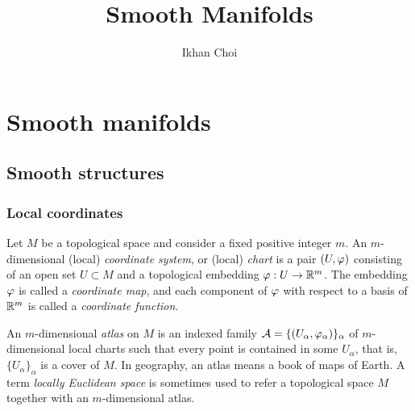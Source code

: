 \documentclass{../../large}
\begin{document}
\title{Smooth Manifolds}
\author{Ikhan Choi}
\maketitle
\tableofcontents





\part{Smooth manifolds}


\chapter{Smooth structures}

\section{Local coordinates}


\begin{prb}[Atlases]
Let $M$ be a topological space and consider a fixed positive integer $m$.
An $m$-dimensional (local) \emph{coordinate system}, or (local) \emph{chart} is a pair $(U,\varphi)$ consisting of an open set $U\subset M$ and a topological embedding $\varphi:U\to\mathbb{R}^m$.
The embedding $\varphi$ is called a \emph{coordinate map}, and each component of $\varphi$ with respect to a basis of $\mathbb{R}^m$ is called a \emph{coordinate function}.

An $m$-dimensional \emph{atlas} on $M$ is an indexed family $\mathcal{A}=\{(U_\alpha,\varphi_\alpha)\}_\alpha$ of $m$-dimensional local charts such that every point is contained in some $U_\alpha$, that is, $\{U_\alpha\}_\alpha$ is a cover of $M$.
In geography, an atlas means a book of maps of Earth.
A term \emph{locally Euclidean space} is sometimes used to refer a topological space $M$ together with an $m$-dimensional atlas.
\begin{parts}
\item 
\end{parts}
\end{prb}
\end{document}
